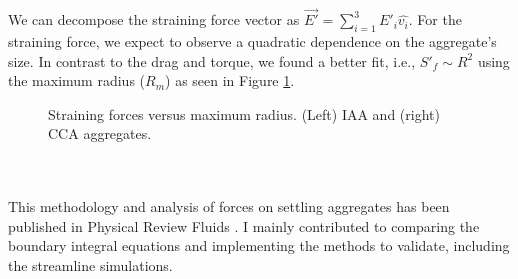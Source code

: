 We can decompose the straining force vector as $\vec{E'} = \sum_{i=1}^3 E'_i \hat{v_i}$. 
For the straining force, we expect to observe a quadratic dependence on the aggregate's size. In contrast to the drag and torque, we found a better fit, i.e., $S'_f \sim R^2$ using the maximum radius ($R_m$) as seen in Figure \ref{fig_straining}. 
\begin{figure}[h]
\begin{center}
\end{center}
\caption{Straining forces versus maximum radius. (Left) IAA and (right) CCA aggregates.}
\label{fig_straining}
\end{figure}
\\
\\
This methodology and analysis of forces on settling aggregates has been published in Physical Review Fluids \cite{yoo_hydrodynamic_2020}.
I mainly contributed to comparing the boundary integral equations and implementing the methods to validate, including the streamline simulations. 
